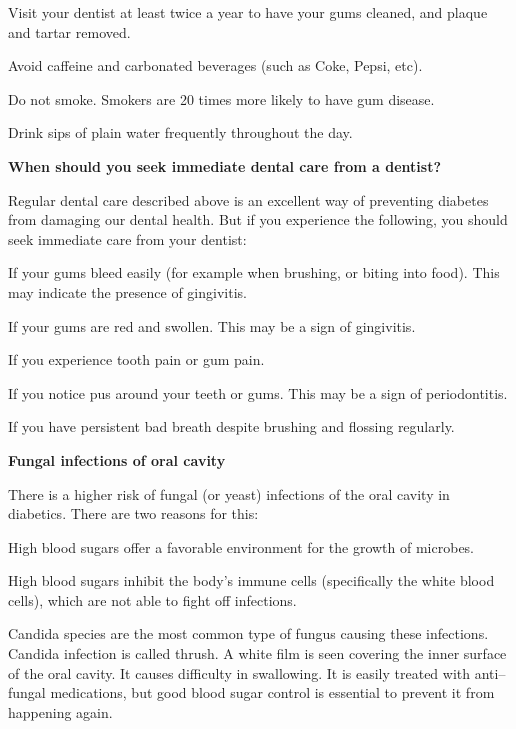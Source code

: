  \item Visit your dentist at least twice a year to have your gums cleaned, and plaque and tartar removed.

 \item Avoid caffeine and carbonated beverages (such as Coke, Pepsi, etc).

 \item Do not smoke. Smokers are 20 times more likely to have gum disease.

 \item Drink sips of plain water frequently throughout the day.

\textbf{When should you seek immediate dental care from a dentist?}

Regular dental care described above is an excellent way of preventing diabetes from damaging our dental health. But if you experience the following, you should seek immediate care from your dentist:

\item If your gums bleed easily (for example when brushing, or biting into food). This may indicate the presence of gingivitis.

 \item If your gums are red and swollen. This may be a sign of gingivitis.

 \item If you experience tooth pain or gum pain.

 \item If you notice pus around your teeth or gums. This may be a sign of periodontitis.

 \item If you have persistent bad breath despite brushing and flossing regularly.

\textbf{Fungal infections of oral cavity}

There is a higher risk of fungal (or yeast) infections of the oral cavity in diabetics. There are two reasons for this:

\item High blood sugars offer a favorable environment for the growth of microbes.

 \item High blood sugars inhibit the body’s immune cells (specifically the white blood cells), which are not able to fight off infections.

Candida species are the most common type of fungus causing these infections. Candida infection is called thrush. A white film is seen covering the inner surface of the oral cavity. It causes difficulty in swallowing. It is easily treated with anti–fungal medications, but good blood sugar control is essential to prevent it from happening again.

